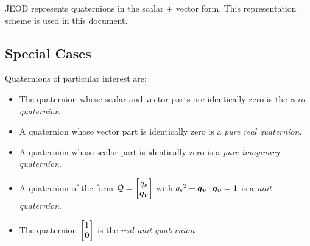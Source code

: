 JEOD represents quaternions in the scalar $+$ vector form.
This representation scheme is used in this document.

\subsection{Special Cases}\label{sec:app_scases}

Quaternions of particular interest are:

\begin{itemize}
\item
The quaternion whose scalar and vector parts are identically zero
is the \emph{zero quaternion}.
\item
A quaternion whose vector part is identically zero
is a \emph{pure real quaternion}.
\item
A quaternion whose scalar part is identically zero
is a \emph{pure imaginary quaternion}.
\item
A quaternion of the form $\quat Q = \quatsv {q_s} {\vect{q_v}}$ with
${q_s}^2 +  \boldsymbol{q_v} \cdot \boldsymbol{q_v} = 1$
is a \emph{unit quaternion}.
\item
The quaternion $\quatsv 1 {\vect{0}}$
is the \emph{real unit quaternion}.
\end{itemize}
 
